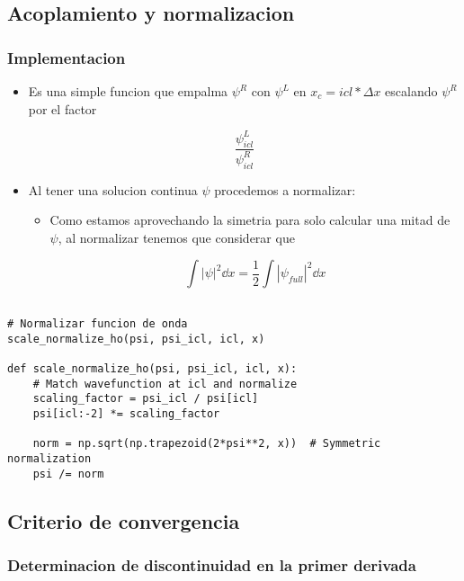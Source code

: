 \documentclass[11pt]{article}
\begin{document}
\subsection{Acoplamiento y normalizacion}
\label{sec:org2fa34bd}

\subsubsection{Implementacion}
\label{sec:org24e7fc9}

\begin{itemize}
\item Es una simple funcion que empalma \(\psi^R\) con \(\psi^L\) en \(x_c = icl*\Delta x\) escalando \(\psi^R\) por el factor

\[ \frac{\psi_{icl}^L}{\psi_{icl}^R} \]

\item Al tener una solucion continua \(\psi\) procedemos a normalizar:
\begin{itemize}
\item Como estamos aprovechando la simetria para solo calcular una mitad de \(\psi\), al normalizar tenemos que considerar que

\[ \int |\psi|^2 \dd{x} = \frac{1}{2} \int |\psi_{full}|^2 \dd{x} \]
\end{itemize}
\end{itemize}

\begin{verbatim}

# Normalizar funcion de onda
scale_normalize_ho(psi, psi_icl, icl, x)

def scale_normalize_ho(psi, psi_icl, icl, x):
    # Match wavefunction at icl and normalize
    scaling_factor = psi_icl / psi[icl]
    psi[icl:-2] *= scaling_factor

    norm = np.sqrt(np.trapezoid(2*psi**2, x))  # Symmetric normalization
    psi /= norm

\end{verbatim}
\subsection{Criterio de convergencia}
\label{sec:org3d7ba66}

\subsubsection{Determinacion de discontinuidad en la primer derivada}
\label{sec:org9c05542}
\end{document}
